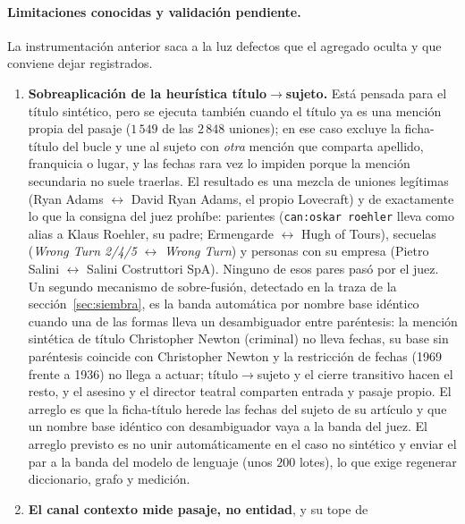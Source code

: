 \documentclass[11pt,a4paper]{article}
\begin{document}
\paragraph{Limitaciones conocidas y validación pendiente.}
La instrumentación anterior saca a la luz defectos que el agregado oculta
y que conviene dejar registrados.
\begin{enumerate}[leftmargin=1.6em, itemsep=1pt]
\item \textbf{Sobreaplicación de la heurística título$\to$sujeto.} Está
  pensada para el título sintético, pero se ejecuta también cuando el
  título ya es una mención propia del pasaje ($1\,549$ de las $2\,848$
  uniones); en ese caso excluye la ficha-título del bucle y une al sujeto
  con \emph{otra} mención que comparta apellido, franquicia o lugar, y las
  fechas rara vez lo impiden porque la mención secundaria no suele
  traerlas. El resultado es una mezcla de uniones legítimas (\guillemotleft{}Ryan
  Adams\guillemotright{} $\leftrightarrow$ \guillemotleft{}David Ryan Adams\guillemotright{}, el propio Lovecraft) y de
  exactamente lo que la consigna del juez prohíbe: parientes
  (\texttt{can:oskar roehler} lleva como alias a Klaus Roehler, su padre;
  \guillemotleft{}Ermengarde\guillemotright{} $\leftrightarrow$ \guillemotleft{}Hugh of Tours\guillemotright{}), secuelas (\emph{Wrong
  Turn 2/4/5} $\leftrightarrow$ \emph{Wrong Turn}) y personas con su empresa
  (\guillemotleft{}Pietro Salini\guillemotright{} $\leftrightarrow$ \guillemotleft{}Salini Costruttori SpA\guillemotright{}). Ninguno de esos
  pares pasó por el juez. Un segundo mecanismo de sobre-fusión, detectado
  en la traza de la sección~\ref{sec:siembra}, es la banda automática por
  nombre base idéntico cuando una de las formas lleva un desambiguador
  entre paréntesis: la mención sintética de título \guillemotleft{}Christopher
  Newton (criminal)\guillemotright{} no lleva fechas, su base sin paréntesis coincide
  con \guillemotleft{}Christopher Newton\guillemotright{} y la restricción de fechas (1969 frente a
  1936) no llega a actuar; título$\to$sujeto y el cierre transitivo hacen
  el resto, y el asesino y el director teatral comparten entrada y pasaje
  propio. El arreglo es que la ficha-título herede las fechas del sujeto
  de su artículo y que un nombre base idéntico con desambiguador vaya a la
  banda del juez. El arreglo previsto es no unir automáticamente en
  el caso no sintético y enviar el par a la banda del modelo de lenguaje
  (unos $200$ lotes), lo que exige regenerar diccionario, grafo y medición.
\item \textbf{El canal contexto mide pasaje, no entidad}, y su tope de

\end{enumerate}
\end{document}
